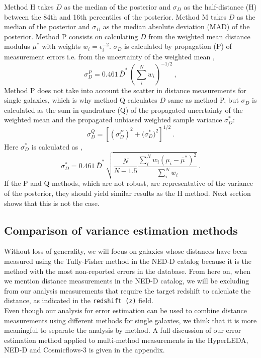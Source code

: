 \documentclass[a4paper,fleqn,usenatbib]{mnras}
\begin{document}
Method H takes $D$ as the median of the posterior and $\sigma_D$ as the half-distance (H) between the 84th and 16th percentiles of the posterior. Method M takes $D$ as the median of the posterior and $\sigma_D$ as the median absolute deviation (MAD) of the posterior. Method P consists on calculating $D$ from the weighted mean distance modulus $\bar{\mu}^*$ with weights $w_i=\epsilon_i^{-2}$. $\sigma_D$ is calculated by propagation (P) of measurement errors  i.e. from the uncertainty of the weighted mean \citep{cosmicflows},
\begin{equation}
\sigma_D^P=0.461\,\bar{D}^*\,\left(\sum_i^Nw_i\right)^{-1/2} \ ,
\end{equation}
Method P does not take into account the scatter in distance measurements for single galaxies, which is why method Q calculates $D$ same as method P, but $\sigma_D$ is calculated as the sum in quadrature (Q) of the propagated uncertainty of the weighted mean and the propagated unbiased weighted sample variance $\sigma_D^*$:
\begin{equation}
\sigma_D^Q=\left[ \left(\sigma_D^P\right)^2+\Big(\sigma_D^*\Big)^2\right]^{1/2} \ .
\end{equation}
Here $\sigma^*_D$ is calculated as  \citep{wstdev},
\begin{equation}
\sigma^*_D=0.461\,\bar{D}^*\,\sqrt{\frac{N}{N-1.5}\frac{\sum_i^Nw_i(\mu_i-\bar{\mu}^*)^2}{\sum_i^Nw_i}}\ .
\end{equation}
If the P and Q methods, which are not robust, are representative of the variance of the posterior, they should yield similar results as the H method. Next section shows that this is not the case.

\subsection{Comparison of variance estimation methods}
\label{sec:comp} 


Without loss of generality, we will focus on galaxies whose distances have been measured using the Tully-Fisher method in the NED-D catalog because it is the method with the most non-reported errors in the database. From here on, when we mention distance measurements in the NED-D catalog, we will be excluding from our analysis measurements that require the target redshift to calculate the distance, as indicated in the \texttt{redshift (z)} field. \\

Even though our analysis for error estimation can be used to combine distance measurements using different methods for single galaxies, we think that it is more meaningful to separate the analysis by method. A full discussion of our error estimation method applied to multi-method measurements in the HyperLEDA, NED-D and Cosmicflows-3 is given in the appendix.\\
\end{document}
